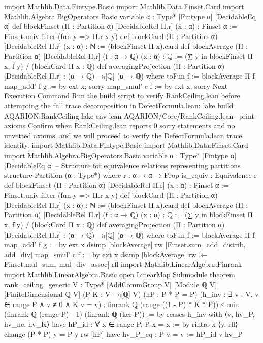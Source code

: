 import Mathlib.Data.Fintype.Basic
import Mathlib.Data.Finset.Card
import Mathlib.Algebra.BigOperators.Basic
variable {α : Type*} [Fintype α] [DecidableEq α]
def blockFinset (Π : Partition α) [DecidableRel Π.r] (x : α) : Finset α :=
  Finset.univ.filter (fun y => Π.r x y)
def blockCard (Π : Partition α) [DecidableRel Π.r] (x : α) : ℕ :=
  (blockFinset Π x).card
def blockAverage (Π : Partition α) [DecidableRel Π.r] (f : α → ℚ) (x : α) : ℚ :=
  (∑ y in blockFinset Π x, f y) / (blockCard Π x : ℚ)
def averagingProjection (Π : Partition α) [DecidableRel Π.r] :
    (α → ℚ) →ₗ[ℚ] (α → ℚ) where
  toFun f := blockAverage Π f
  map_add' f g := by ext x; sorry
  map_smul' c f := by ext x; sorry
Next Execution Command
Run the build script to verify RankCeiling.lean before attempting the full trace decomposition in DefectFormula.lean:
lake build AQARION:RankCeiling
lake env lean AQARION/Core/RankCeiling.lean --print-axioms
Confirm when RankCeiling.lean reports 0 sorry statements and no unvetted axioms, and we will proceed to verify the DefectFormula.lean trace identity.
import Mathlib.Data.Fintype.Basic
import Mathlib.Data.Finset.Card
import Mathlib.Algebra.BigOperators.Basic
variable {α : Type*} [Fintype α] [DecidableEq α]
-- Structure for equivalence relations representing partitions
structure Partition (α : Type*) where
  r : α → α → Prop
  is_equiv : Equivalence r
def blockFinset (Π : Partition α) [DecidableRel Π.r] (x : α) : Finset α :=
  Finset.univ.filter (fun y => Π.r x y)
def blockCard (Π : Partition α) [DecidableRel Π.r] (x : α) : ℕ :=
  (blockFinset Π x).card
def blockAverage (Π : Partition α) [DecidableRel Π.r] (f : α → ℚ) (x : α) : ℚ :=
  (∑ y in blockFinset Π x, f y) / (blockCard Π x : ℚ)
def averagingProjection (Π : Partition α) [DecidableRel Π.r] :
    (α → ℚ) →ₗ[ℚ] (α → ℚ) where
  toFun f := blockAverage Π f
  map_add' f g := by
    ext x
    dsimp [blockAverage]
    rw [Finset.sum_add_distrib, add_div]
  map_smul' c f := by
    ext x
    dsimp [blockAverage]
    rw [← Finset.mul_sum, mul_div_assoc]
    rfl
import Mathlib.LinearAlgebra.Finrank
import Mathlib.LinearAlgebra.Basic
open LinearMap Submodule
theorem rank_ceiling_generic
    {V : Type*} [AddCommGroup V] [Module ℚ V] [FiniteDimensional ℚ V]
    (P K : V →ₗ[ℚ] V)
    (hP : P * P = P)
    (h_inv : ∃ v : V, v ∈ range P ∧ v ≠ 0 ∧ K v = v) :
    finrank ℚ (range ((1 - P) * K * P))
      ≤ min (finrank ℚ (range P) - 1) (finrank ℚ (ker P)) := by
  rcases h_inv with ⟨v, hv_P, hv_ne, hv_K⟩
  have hP_id : ∀ x ∈ range P, P x = x := by
    rintro x ⟨y, rfl⟩
    change (P * P) y = P y
    rw [hP]
  have hv_P_eq : P v = v := hP_id v hv_P
